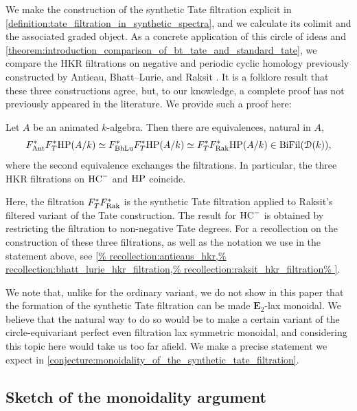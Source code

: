 \documentclass[oneside,a4paper]{amsart}
\begin{document}
We make the construction of the synthetic Tate filtration explicit in \cref{definition:tate_filtration_in_synthetic_spectra}, and we calculate its colimit and the associated graded object. As a concrete application of this circle of ideas and \cref{theorem:introduction_comparison_of_bt_tate_and_standard_tate}, we compare the HKR filtrations on negative and periodic cyclic homology previously constructed by Antieau, Bhatt--Lurie, and Raksit \cite{antieau2019periodic, bhatt-lurie:apc, raksit:2020}. It is a folklore result that these three constructions agree, but, to our knowledge, a complete proof has not previously appeared in the literature. We provide such a proof here:

\begin{theorem}[{\ref{theorem:antieau_bhattlurie_raksit_hkr_filtrations_on_hcminus_are_equivalent}}]
\label{theorem:introduction_hkr_comparison}
Let $A$ be an animated $k$-algebra. Then there are equivalences, natural in $A$,
\[
F^{\ast}_{\mathrm{Ant}} F_T^* \mathrm{HP}(A / k) \simeq F^{\ast}_{\mathrm{BhLu}} F_T^*\mathrm{HP}(A / k) \simeq F^*_T F^{\ast}_{\mathrm{Rak}} \mathrm{HP}(A / k) \in \mathrm{BiFil}(\EuScript{D}(k)), 
\]
where the second equivalence exchanges the filtrations. In particular, the three HKR filtrations on $\mathrm{HC}^-$ and $\mathrm{HP}$ coincide.
\end{theorem}
Here, the filtration $F^{\ast}_{T}F^{\ast}_{\mathrm{Rak}}$ is the synthetic Tate filtration applied to Raksit's filtered variant of the Tate construction. The result for $\mathrm{HC}^{-}$ is obtained by restricting the filtration to non-negative Tate degrees. For a recollection on the construction of these three filtrations, as well as the notation we use in the statement above, see \cref{%
  recollection:antieaus_hkr,%
  recollection:bhatt_lurie_hkr_filtration,%
  recollection:raksit_hkr_filtration%
}.

We note that, unlike for the ordinary variant, we do not show in this paper that the formation of the synthetic Tate filtration can be made $\mathbf{E}_{2}$-lax monoidal. We believe that the natural way to do so would be to make a certain variant of the circle-equivariant perfect even filtration lax symmetric monoidal, and considering this topic here would take us too far afield. We make a precise statement we expect in \cref{conjecture:monoidality_of_the_synthetic_tate_filtration}. 

\subsection{Sketch of the monoidality argument} 
\label{subsection:introduction_sketch_of_the_monoidality_argument}
\end{document}
